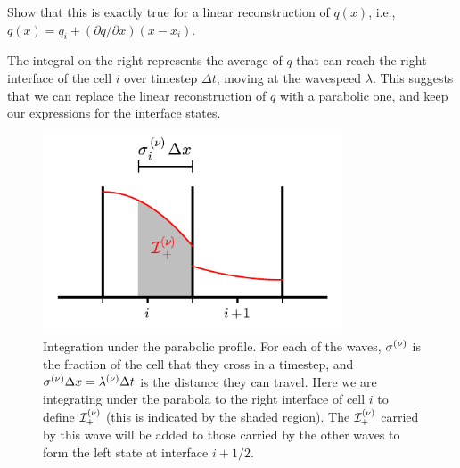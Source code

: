 \begin{exercise}
{Show that this is exactly true for a linear reconstruction of $q(x)$, i.e.,
$q(x) = q_i + (\partial q/\partial x) (x - x_i)$.}
\end{exercise}

\noindent The integral on the right represents the average of $q$ that
can reach the right interface of the cell $i$ over timestep $\Delta
t$, moving at the wavespeed $\lambda$.  This suggests that we can
replace the linear reconstruction of $q$ with a parabolic one, and
keep our expressions for the interface states.

\begin{figure}
\centering
\includegraphics[width=3.5in]{ppm-trace}
\caption[Integration under the parabola profile for to an
  interface]{\label{fig:ppm_trace} Integration under the parabolic
  profile.  For each of the waves, $\sigma^{(\nu)}$ is the fraction of
  the cell that they cross in a timestep, and $\sigma^{(\nu)} \Delta x =
  \lambda^{(\nu)} \Delta t$ is the distance they can travel.  Here we are
  integrating under the parabola to the right interface of cell $i$ to
  define ${\mathcal{I}}_+^{(\nu)}$ (this is indicated by the shaded
  region).  The ${\mathcal{I}}_+^{(\nu)}$ carried by this wave will be
  added to those carried by the other waves to form the left state at
  interface $i+1/2$.}
\end{figure}

